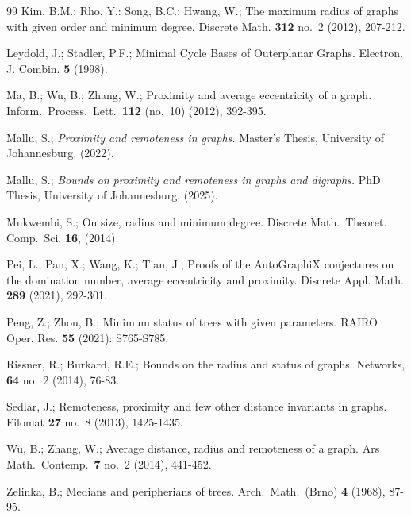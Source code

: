\documentclass[a4paper,11pt]{article}
\numberwithin{equation}{theorem}
\begin{document}
\begin{thebibliography}{99}
 Kim, B.M.: Rho, Y.: Song, B.C.:  Hwang, W.; 
   The maximum radius of graphs with given order and minimum degree. 
   Discrete Math. {\bf 312} no.\ 2 (2012), 207-212.
     
 Leydold, J.; Stadler, P.F.; Minimal Cycle Bases of Outerplanar Graphs. 
Electron. J. Combin. {\bf 5} (1998).

 Ma, B.; Wu, B.; Zhang, W.; Proximity and average eccentricity of a graph. Inform.\ Process.\ Lett.\ {\bf 112} (no.\ 10) (2012), 392-395. 
    
 Mallu, S.; \textit{Proximity and remoteness in graphs.}  Master’s Thesis, University of  Johannesburg, (2022).

 Mallu, S.; \textit{Bounds on proximity and remoteness in graphs and digraphs.}  
PhD Thesis, University of  Johannesburg, (2025).
     

 Mukwembi, S.; 
On size, radius and minimum degree. 
Discrete Math.\ Theoret. Comp.\ Sci. {\bf 16}, (2014).  
     
 Pei, L.; Pan, X.; Wang, K.; Tian, J.; Proofs of the AutoGraphiX conjectures on the domination number, average eccentricity and proximity. Discrete Appl. Math. {\bf 289} (2021), 292-301.   
    
 Peng, Z.; Zhou, B.; Minimum status of trees with given parameters. 
RAIRO Oper. Res. {\bf 55} (2021): S765-S785. 


 Rissner, R.; Burkard, R.E.; Bounds on the radius and status of graphs. Networks, {\bf 64} no.\ 2 (2014), 76-83.   

 Sedlar, J.; Remoteness, proximity and few other distance invariants in graphs. Filomat {\bf 27} no.\ 8 (2013), 1425-1435.   

  
 Wu, B.; Zhang, W.; Average distance, radius and remoteness of a graph. Ars Math.\ Contemp.\ {\bf 7} no.\ 2 (2014), 441-452.

 Zelinka, B.; Medians and peripherians of trees. Arch.\ Math.\ (Brno) {\bf 4} (1968), 87-95.
\end{thebibliography}
\end{document}

